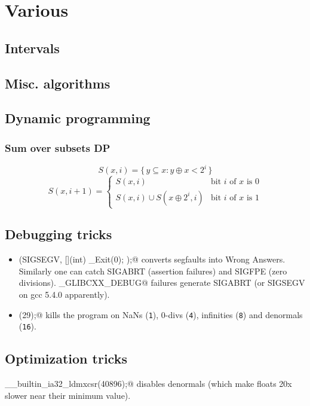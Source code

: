 \chapter{Various}

\section{Intervals}

\section{Misc. algorithms}

\section{Dynamic programming}
	\subsection{Sum over subsets DP}
		\[ S(x, i) = \{\, y \subseteq x : y \oplus x < 2^i \,\} \]
		\[ S(x, i+1) = \begin{cases}
			S(x, i) & \text{bit } i \text{ of } x \text{ is } 0 \\
			S(x, i) \cup S(x \oplus 2^i, i) & \text{bit } i \text{ of } x \text{ is } 1
		\end{cases} \]

\section{Debugging tricks}
	\begin{itemize}
		\item \verb@signal(SIGSEGV, [](int) { _Exit(0); });@ converts segfaults into Wrong Answers.
			Similarly one can catch SIGABRT (assertion failures) and SIGFPE (zero divisions).
			\verb@_GLIBCXX_DEBUG@ failures generate SIGABRT (or SIGSEGV on gcc 5.4.0 apparently).
		\item \verb@feenableexcept(29);@ kills the program on NaNs (\texttt 1), 0-divs (\texttt 4), infinities (\texttt 8) and denormals (\texttt{16}).
	\end{itemize}

\section{Optimization tricks}
	\verb@__builtin_ia32_ldmxcsr(40896);@ disables denormals (which make floats 20x slower near their minimum value).

